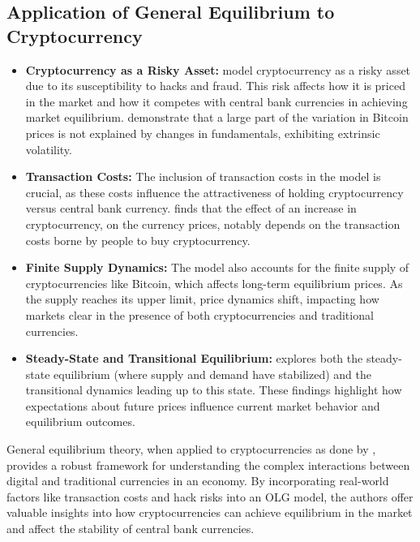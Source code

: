 \subsection{Application of General Equilibrium to Cryptocurrency}

    \begin{itemize}
        \item \textbf{Cryptocurrency as a Risky Asset:}  model cryptocurrency as a risky asset due to its susceptibility to hacks and fraud. This risk affects how it is priced in the market and how it competes with central bank currencies in achieving market equilibrium.  demonstrate that a large part of the variation in Bitcoin prices is not explained by changes in fundamentals, exhibiting extrinsic volatility.
        \item \textbf{Transaction Costs:} The inclusion of transaction costs in the model is crucial, as these costs influence the attractiveness of holding cryptocurrency versus central bank currency.  finds that the effect of an increase in cryptocurrency, on the currency prices, notably depends on the transaction costs borne by people to buy cryptocurrency.
        \item \textbf{Finite Supply Dynamics:} The model also accounts for the finite supply of cryptocurrencies like Bitcoin, which affects long-term equilibrium prices. As the supply reaches its upper limit, price dynamics shift, impacting how markets clear in the presence of both cryptocurrencies and traditional currencies.
        \item \textbf{Steady-State and Transitional Equilibrium:}  explores both the steady-state equilibrium (where supply and demand have stabilized) and the transitional dynamics leading up to this state. These findings highlight how expectations about future prices influence current market behavior and equilibrium outcomes.
    \end{itemize}

General equilibrium theory, when applied to cryptocurrencies as done by , provides a robust framework for understanding the complex interactions between digital and traditional currencies in an economy. By incorporating real-world factors like transaction costs and hack risks into an OLG model, the authors offer valuable insights into how cryptocurrencies can achieve equilibrium in the market and affect the stability of central bank currencies. 


